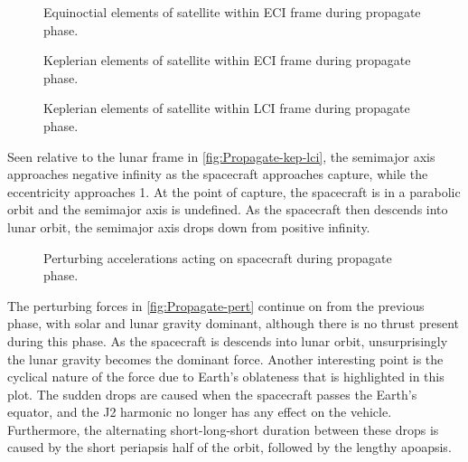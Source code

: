 \begin{figure}
\caption{Equinoctial elements of satellite within ECI frame during propagate phase.} \label{fig:Propagate-mee}
\centering
\def\svgwidth{\figurewidth}

\end{figure}

\begin{figure}
\caption{Keplerian elements of satellite within ECI frame during propagate phase.} \label{fig:Propagate-kep}
\centering
\def\svgwidth{\figurewidth}

\end{figure}

\begin{figure}
\caption{Keplerian elements of satellite within LCI frame during propagate phase.} \label{fig:Propagate-kep-lci}
\centering
\def\svgwidth{\figurewidth}

\end{figure}

Seen relative to the lunar frame in \autoref{fig:Propagate-kep-lci}, the semimajor axis approaches negative infinity as the spacecraft approaches capture, while the eccentricity approaches 1. At the point of capture, the spacecraft is in a parabolic orbit and the semimajor axis is undefined. As the spacecraft then descends into lunar orbit, the semimajor axis drops down from positive infinity.

\begin{figure}
\caption{Perturbing accelerations acting on spacecraft during propagate phase.} \label{fig:Propagate-pert}
\centering
\def\svgwidth{\figurewidth}

\end{figure}

The perturbing forces in \autoref{fig:Propagate-pert} continue on from the previous phase, with solar and lunar gravity dominant, although there is no thrust present during this phase. As the spacecraft is descends into lunar orbit, unsurprisingly the lunar gravity becomes the dominant force. Another interesting point is the cyclical nature of the force due to Earth's oblateness that is highlighted in this plot. The sudden drops are caused when the spacecraft passes the Earth's equator, and the J2 harmonic no longer has any effect on the vehicle. Furthermore, the alternating short-long-short duration between these drops is caused by the short periapsis half of the orbit, followed by the lengthy apoapsis.

%

